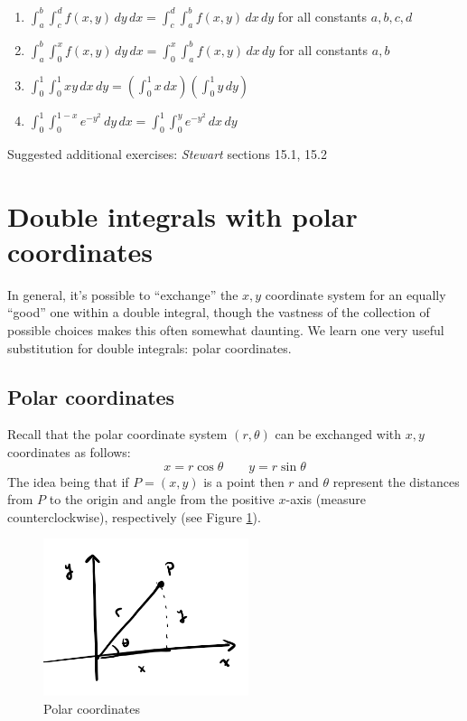 \documentclass[12pt]{article}
\numberwithin{equation}{subsection}
\numberwithin{figure}{subsection}
\theoremstyle{note}
\begin{document}
{\begin{enumerate}[label=\arabic*.]
\begin{enumerate}
	\item $\displaystyle \int_a^b \int_c^d f(x,y)\,dy\,dx= \int_c^d \int_a^b f(x,y)\,dx\,dy$ for all constants $a,b,c,d$
	\item $\displaystyle \int_a^b \int_0^x f(x,y)\,dy\,dx= \int_0^x \int_a^b f(x,y)\,dx\,dy$ for all constants $a,b$
	\item $\displaystyle \int_0^1 \int_0^1 xy\,dx\,dy=\left( \int_0^1 x\,dx \right)\left( \int_0^1 y\,dy\right)$
	\item $\displaystyle \int_0^1 \int_0^{1-x} e^{-y^2}\,dy\,dx= \int_0^1 \int_0^y e^{-y^2}\,dx\,dy$
\end{enumerate}
\end{enumerate}


Suggested additional exercises: \textit{Stewart} sections 15.1, 15.2


\section[Polar coordinates]{Double integrals with polar coordinates}

In general, it's possible to ``exchange'' the $x,y$ coordinate system for an equally ``good'' one within a double integral, though the vastness of the collection of possible choices makes this often somewhat daunting. We learn one very useful substitution for double integrals: polar coordinates.

\subsection{Polar coordinates}
Recall that the polar coordinate system $(r,\theta)$ can be exchanged with $x,y$ coordinates as follows:
\begin{equation}x=r\cos\theta \qquad y=r\sin\theta \label{xy-to-polar} \end{equation}
The idea being that if $P=(x,y)$ is a point then $r$ and $\theta$ represent the distances from $P$ to the origin and angle from the positive $x$-axis (measure counterclockwise), respectively (see Figure \ref{fig-polar-coord}).

\begin{figure}[h!]
\centering
\includegraphics[width=60mm]{Images/polar-coord} 
\caption{Polar coordinates}
\label{fig-polar-coord}
\end{figure}

}
\end{document}
